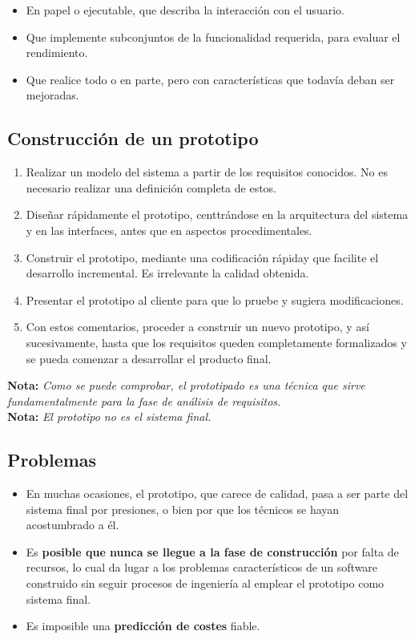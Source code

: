 \begin{itemize}
   \item En papel o ejecutable, que describa la interacción con el usuario.
   \item Que implemente subconjuntos de la funcionalidad requerida, para evaluar el rendimiento.
   \item Que realice todo o en parte, pero con características que todavía deban ser mejoradas.
\end{itemize}

\subsection{Construcción de un prototipo}

\begin{enumerate}
   \item Realizar un modelo del sistema a partir de los requisitos conocidos. No es necesario realizar una definición completa de estos.
   \item Diseñar rápidamente el prototipo, centtrándose en la arquitectura del sistema y en las interfaces, antes que en aspectos procedimentales.
   \item Construir el prototipo, mediante una codificación rápiday que facilite el desarrollo incremental. Es irrelevante la calidad obtenida.
   \item Presentar el prototipo al cliente para que lo pruebe y sugiera modificaciones.
   \item Con estos comentarios, proceder a construir un nuevo prototipo, y así sucesivamente, hasta que los requisitos queden completamente formalizados y se pueda comenzar a desarrollar el producto final.
\end{enumerate}

\textbf{Nota:} \textit{Como se puede comprobar, el prototipado es una técnica que sirve fundamentalmente para la fase de análisis de requisitos.}\\

\textbf{Nota:} \textit{El prototipo no es el sistema final.}

\subsection{Problemas}
\begin{itemize}
   \item En muchas ocasiones, el prototipo, que carece de calidad, pasa a ser parte del sistema final por presiones, o bien por que los técnicos se hayan acostumbrado a él.
   \item Es \textbf{posible que nunca se llegue a la fase de construcción} por falta de recursos, lo cual da lugar a los problemas característicos de un software construido sin seguir procesos de ingeniería al emplear el prototipo como sistema final.
   \item Es imposible una \textbf{predicción de costes} fiable.
\end{itemize}



